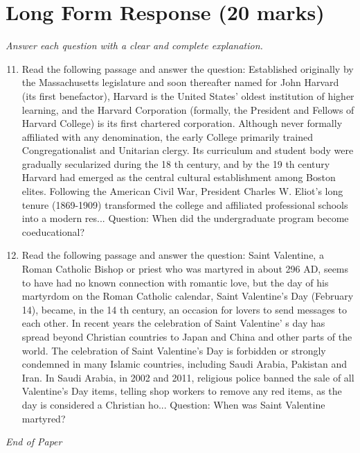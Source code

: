 \documentclass[12pt]{article}
\begin{document}
\section*{Long Form Response (20 marks)}
\textit{Answer each question with a clear and complete explanation.}
\begin{enumerate}[label=\arabic*.]
\setcounter{enumi}{10}
\item Read the following passage and answer the question: Established originally by the Massachusetts legislature and soon thereafter named for John Harvard (its first benefactor), Harvard is the United States' oldest institution of higher learning, and the Harvard Corporation (formally, the President and Fellows of Harvard College) is its first chartered corporation. Although never formally affiliated with any denomination, the early College primarily trained Congregationalist and Unitarian clergy. Its curriculum and student body were gradually secularized during the 18 th century, and by the 19 th century Harvard had emerged as the central cultural establishment among Boston elites. Following the American Civil War, President Charles W. Eliot's long tenure (1869-1909) transformed the college and affiliated professional schools into a modern res... Question: When did the undergraduate program become coeducational?
\item Read the following passage and answer the question: Saint Valentine, a Roman Catholic Bishop or priest who was martyred in about 296 AD, seems to have had no known connection with romantic love, but the day of his martyrdom on the Roman Catholic calendar, Saint Valentine's Day (February 14), became, in the 14 th century, an occasion for lovers to send messages to each other. In recent years the celebration of Saint Valentine' s day has spread beyond Christian countries to Japan and China and other parts of the world. The celebration of Saint Valentine's Day is forbidden or strongly condemned in many Islamic countries, including Saudi Arabia, Pakistan and Iran. In Saudi Arabia, in 2002 and 2011, religious police banned the sale of all Valentine's Day items, telling shop workers to remove any red items, as the day is considered a Christian ho... Question: When was Saint Valentine martyred?
\end{enumerate}

\vfill
\noindent\textit{End of Paper}
\end{document}
